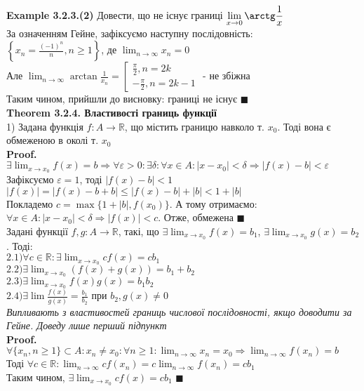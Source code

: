 \documentclass[a4paper, 14pt]{extarticle}
\def\huge{\displaystyle}
\def\bigline{\vspace{5mm}\\}
\def\ex#1{\textbf{Example {#1}}}
\def\th#1{\textbf{Theorem {#1}}}
\def\proof{\textbf{Proof.}\\}
\def\bigline{\vspace{5mm}\\}
\def\qed{$\blacksquare$}
\begin{document}
	\ex{3.2.3.(2)} Довести, що не існує границі $\huge \lim_{x \to 0} \arctg \frac{1}{x}$\\
	За означенням Гейне, зафіксуємо наступну послідовність:\\
	$\huge \left\{x_n = \frac{(-1)^n}{n}, n \geq 1\right\}$, де $\huge \lim_{n \to \infty} x_n = 0$\\
	Але $\huge \lim_{n \to \infty} \arctan \frac{1}{x_n} = \left[ \begin{gathered} \frac{\pi}{2}, n = 2k \\ -\frac{\pi}{2}, n = 2k-1 \end{gathered} \right.$ - не збіжна\\
	Таким чином, прийшли до висновку: границі не існує \qed
	\bigline
	\th{3.2.4. Властивості границь функції}\\
	1) Задана функція $f: A \to \mathbb{R}$, що містить границю навколо т. $x_0$. Тоді вона є обмеженою в околі т. $x_0$\\
	\proof
	$\exists \huge \lim_{x \to x_0} f(x) = b \Rightarrow \forall \varepsilon > 0: \exists \delta: \forall x \in A: |x-x_0|<\delta \Rightarrow |f(x)-b|<\varepsilon$\\
	Зафіксуємо $\varepsilon = 1$, тоді $|f(x) -b| < 1$\\
	$|f(x)| = |f(x) - b + b| \leq |f(x) - b| + |b| < 1 + |b|$\\
	Покладемо $c = \max\{1 + |b|, f(x_0) \}$. А тому отримаємо:\\
	$\forall x \in A: |x-x_0| < \delta \Rightarrow |f(x)| < c$. Отже, обмежена \qed
	\bigline
	Задані функції $f,g: A \to \mathbb{R}$, такі, що $\exists \huge \lim_{x \to x_0} f(x) = b_1$, $\exists \huge \lim_{x \to x_0} g(x) = b_2$. Тоді:\\
	$2.1) \forall c \in \mathbb{R}: \exists \huge \lim_{x \to x_0} cf(x) = c b_1$\\
	$2.2) \exists \huge \lim_{x \to x_0} (f(x)+g(x)) = b_1 + b_2$\\
	$2.3) \exists \huge \lim_{x \to x_0} f(x)g(x) = b_1 b_2$\\
	$2.4) \exists \huge \lim \frac{f(x)}{g(x)} = \frac{b_1}{b_2}$ при $b_2, g(x) \neq 0$\\
	\textit{Випливають з властивостей границь числової послідовності, якщо доводити за Гейне. Доведу лише перший підпункт}\\
	\proof
	$\forall \{x_n, n \geq 1\} \subset A: x_n \neq x_0: \forall n \geq 1: \huge \lim_{n \to \infty} x_n = x_0 \Rightarrow \lim_{n \to \infty} f(x_n) = b$\\
	Тоді $\huge \forall c \in \mathbb{R}: \lim_{n \to \infty} c f(x_n) = c \lim_{n \to \infty} f(x_n) = c b_1$\\
	Таким чином, $\exists \huge \lim_{x \to x_0} cf(x) = c b_1$ \qed
	\bigline
	
\end{document}
